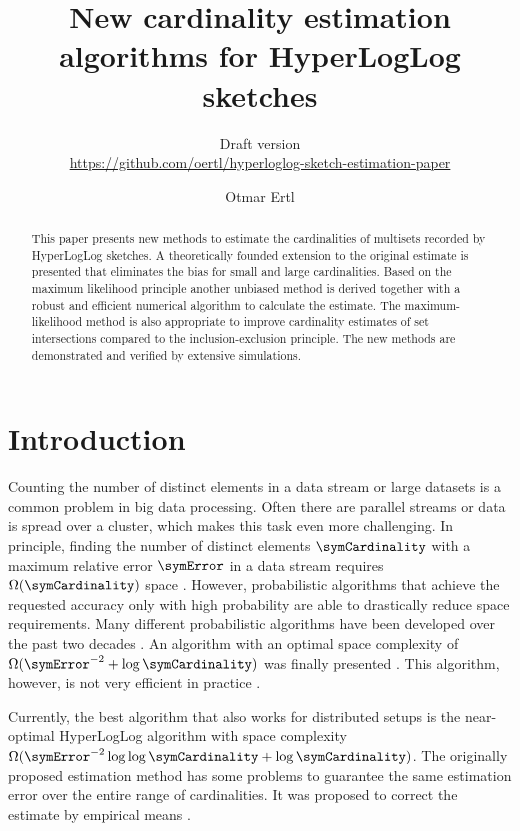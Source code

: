 \documentclass[a4paper]{scrartcl}
\title{New cardinality estimation algorithms for HyperLogLog sketches}
\subtitle{Draft version \\ \url{https://github.com/oertl/hyperloglog-sketch-estimation-paper}}
\author{Otmar Ertl}
\begin{document}
\maketitle
\begin{abstract}
This paper presents new methods to estimate the cardinalities of multisets recorded by HyperLogLog sketches. A theoretically founded extension to the original estimate is presented that eliminates the bias for small and large cardinalities. Based on the maximum likelihood principle another unbiased method is derived together with a robust and efficient numerical algorithm to calculate the estimate. The maximum-likelihood method is also appropriate to improve cardinality estimates of set intersections compared to the inclusion-exclusion principle. The new methods are demonstrated and verified by extensive simulations.
\end{abstract}

\section{Introduction}
Counting the number of distinct elements in a data stream or large datasets is a common problem in big data processing. Often there are parallel streams  or data is spread over a cluster, which makes this task even more challenging.
In principle, finding the number of distinct elements $\symCardinality$ with a maximum relative error $\symError$  in a data stream requires $\Omega(\symCardinality)$ space \cite{Alon1999}. However, probabilistic algorithms that achieve the requested accuracy only with high probability are able to drastically reduce space requirements. Many different probabilistic algorithms have been developed over the past two decades \cite{Metwally2008,Ting2014}. An algorithm with an optimal space complexity of $\Omega(\symError^{-2}+\log \symCardinality)$ \cite{Alon1999, Indyk2003} was finally presented \cite{Kane2010}. This algorithm, however, is not very efficient in practice \cite{Ting2014}.

Currently, the best algorithm that also works for distributed setups is the near-optimal HyperLogLog algorithm \cite{Flajolet2007} with space complexity $\Omega(\symError^{-2} \log\log\symCardinality +\log \symCardinality)$. The originally proposed estimation method has some problems to guarantee the same estimation error over the entire range of cardinalities. It was proposed to correct the estimate by empirical means \cite{Heule2013,Rhodes2015,Sanfilippo2014}. 
\end{document}

